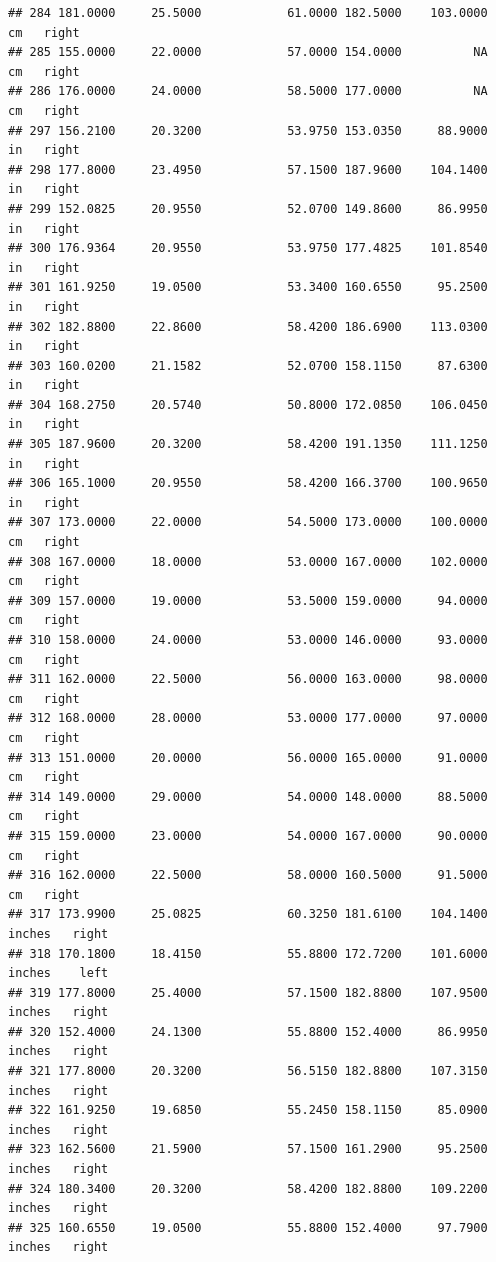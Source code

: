 \documentclass[]{article}
\begin{document}
\begin{verbatim}
## 284 181.0000     25.5000            61.0000 182.5000    103.0000     cm   right
## 285 155.0000     22.0000            57.0000 154.0000          NA     cm   right
## 286 176.0000     24.0000            58.5000 177.0000          NA     cm   right
## 297 156.2100     20.3200            53.9750 153.0350     88.9000     in   right
## 298 177.8000     23.4950            57.1500 187.9600    104.1400     in   right
## 299 152.0825     20.9550            52.0700 149.8600     86.9950     in   right
## 300 176.9364     20.9550            53.9750 177.4825    101.8540     in   right
## 301 161.9250     19.0500            53.3400 160.6550     95.2500     in   right
## 302 182.8800     22.8600            58.4200 186.6900    113.0300     in   right
## 303 160.0200     21.1582            52.0700 158.1150     87.6300     in   right
## 304 168.2750     20.5740            50.8000 172.0850    106.0450     in   right
## 305 187.9600     20.3200            58.4200 191.1350    111.1250     in   right
## 306 165.1000     20.9550            58.4200 166.3700    100.9650     in   right
## 307 173.0000     22.0000            54.5000 173.0000    100.0000     cm   right
## 308 167.0000     18.0000            53.0000 167.0000    102.0000     cm   right
## 309 157.0000     19.0000            53.5000 159.0000     94.0000     cm   right
## 310 158.0000     24.0000            53.0000 146.0000     93.0000     cm   right
## 311 162.0000     22.5000            56.0000 163.0000     98.0000     cm   right
## 312 168.0000     28.0000            53.0000 177.0000     97.0000     cm   right
## 313 151.0000     20.0000            56.0000 165.0000     91.0000     cm   right
## 314 149.0000     29.0000            54.0000 148.0000     88.5000     cm   right
## 315 159.0000     23.0000            54.0000 167.0000     90.0000     cm   right
## 316 162.0000     22.5000            58.0000 160.5000     91.5000     cm   right
## 317 173.9900     25.0825            60.3250 181.6100    104.1400 inches   right
## 318 170.1800     18.4150            55.8800 172.7200    101.6000 inches    left
## 319 177.8000     25.4000            57.1500 182.8800    107.9500 inches   right
## 320 152.4000     24.1300            55.8800 152.4000     86.9950 inches   right
## 321 177.8000     20.3200            56.5150 182.8800    107.3150 inches   right
## 322 161.9250     19.6850            55.2450 158.1150     85.0900 inches   right
## 323 162.5600     21.5900            57.1500 161.2900     95.2500 inches   right
## 324 180.3400     20.3200            58.4200 182.8800    109.2200 inches   right
## 325 160.6550     19.0500            55.8800 152.4000     97.7900 inches   right

\end{verbatim}
\end{document}
